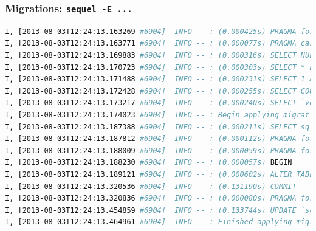 \documentclass{beamer}
\begin{document}
\begin{frame}[fragile]\frametitle{Migrations: \texttt{sequel -E ...}} 

  \begin{lstlisting}[language=bash, basicstyle=\tiny, escapechar={^}]
I, [2013-08-03T12:24:13.163269 #6904]  INFO -- : (0.000425s) PRAGMA foreign_keys = 1
I, [2013-08-03T12:24:13.163771 #6904]  INFO -- : (0.000077s) PRAGMA case_sensitive_like = 1
I, [2013-08-03T12:24:13.169883 #6904]  INFO -- : (0.000316s) SELECT NULL FROM `schema_info` LIMIT 1
I, [2013-08-03T12:24:13.170723 #6904]  INFO -- : (0.000303s) SELECT * FROM `schema_info` LIMIT 1
I, [2013-08-03T12:24:13.171488 #6904]  INFO -- : (0.000231s) SELECT 1 AS 'one' FROM `schema_info` LIMIT 1
I, [2013-08-03T12:24:13.172428 #6904]  INFO -- : (0.000255s) SELECT COUNT(*) AS 'count' FROM `schema_info` LIMIT 1
I, [2013-08-03T12:24:13.173217 #6904]  INFO -- : (0.000240s) SELECT `version` FROM `schema_info` LIMIT 1
I, [2013-08-03T12:24:13.174023 #6904]  INFO -- : Begin applying migration version 2, direction: up
I, [2013-08-03T12:24:13.187388 #6904]  INFO -- : (0.000211s) SELECT sqlite_version() LIMIT 1
I, [2013-08-03T12:24:13.187812 #6904]  INFO -- : (0.000112s) PRAGMA foreign_keys
I, [2013-08-03T12:24:13.188009 #6904]  INFO -- : (0.000059s) PRAGMA foreign_keys = off
I, [2013-08-03T12:24:13.188230 #6904]  INFO -- : (0.000057s) BEGIN
I, [2013-08-03T12:24:13.189121 #6904]  INFO -- : (0.000602s) ALTER TABLE `authors` ADD COLUMN `age` integer
I, [2013-08-03T12:24:13.320536 #6904]  INFO -- : (0.131190s) COMMIT
I, [2013-08-03T12:24:13.320836 #6904]  INFO -- : (0.000080s) PRAGMA foreign_keys = on
I, [2013-08-03T12:24:13.454859 #6904]  INFO -- : (0.133744s) UPDATE `schema_info` SET `version` = 2
I, [2013-08-03T12:24:13.464961 #6904]  INFO -- : Finished applying migration version 2, direction: up, took 0.290906 seconds
  \end{lstlisting}

\end{frame}
\end{document}
